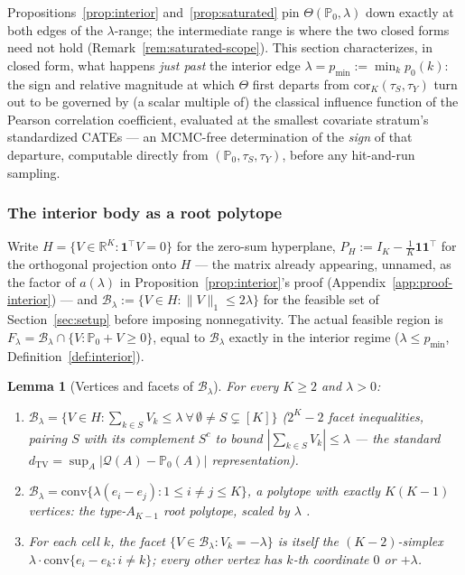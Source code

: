 \documentclass[11pt]{article}
\theoremstyle{plain}
\newtheorem{lemma}[theorem]{Lemma}
\theoremstyle{definition}
\theoremstyle{remark}
\newcommand{\PP}{\mathbb{P}}
\newcommand{\R}{\mathbb{R}}
\newcommand{\cB}{\mathcal{B}}
\newcommand{\Q}{\mathcal{Q}}
\newcommand{\Corr}{\mathrm{cor}}
\begin{document}
Propositions~\ref{prop:interior} and~\ref{prop:saturated} pin $\Theta(\PP_0,\lambda)$
down exactly at both edges of the $\lambda$-range; the intermediate range is where the
two closed forms need not hold (Remark~\ref{rem:saturated-scope}). This section
characterizes, in closed form, what happens \emph{just past} the interior edge
$\lambda=p_{\min}:=\min_kp_0(k)$: the sign and relative magnitude at which $\Theta$
first departs from $\Corr_K(\tau_S,\tau_Y)$ turn out to be governed by (a scalar
multiple of) the classical influence function of the Pearson correlation
coefficient, evaluated at the smallest covariate stratum's standardized CATEs --- an
MCMC-free determination of the \emph{sign} of that departure, computable directly
from $(\PP_0,\tau_S,\tau_Y)$, before any hit-and-run sampling.

\subsubsection{The interior body as a root polytope}

Write $H=\{V\in\R^K:\mathbf1^\top V=0\}$ for the zero-sum hyperplane,
$P_H:=I_K-\frac1K\mathbf1\mathbf1^\top$ for the orthogonal projection onto $H$ ---
the matrix already appearing, unnamed, as the factor of $a(\lambda)$ in
Proposition~\ref{prop:interior}'s proof (Appendix~\ref{app:proof-interior}) --- and
$\cB_\lambda:=\{V\in H:\|V\|_1\le2\lambda\}$ for the feasible set of
Section~\ref{sec:setup} before imposing nonnegativity. The actual feasible region is
$F_\lambda=\cB_\lambda\cap\{V:\PP_0+V\ge0\}$, equal to $\cB_\lambda$ exactly in the
interior regime ($\lambda\le p_{\min}$, Definition~\ref{def:interior}).

\begin{lemma}[Vertices and facets of $\cB_\lambda$]\label{lem:root-polytope}
For every $K\ge2$ and $\lambda>0$:
\begin{enumerate}[label=(\alph*)]
    \item $\cB_\lambda=\{V\in H:\sum_{k\in S}V_k\le\lambda\ \forall\,\emptyset\ne
    S\subsetneq[K]\}$ ($2^K-2$ facet inequalities, pairing $S$ with its complement
    $S^c$ to bound $|\sum_{k\in S}V_k|\le\lambda$ --- the standard
    $d_{\mathrm{TV}}=\sup_A|\Q(A)-\PP_0(A)|$ representation).
    \item $\cB_\lambda=\mathrm{conv}\{\lambda(e_i-e_j):1\le i\ne j\le K\}$, a polytope
    with exactly $K(K-1)$ vertices: the type-$A_{K-1}$ root polytope, scaled by
    $\lambda$ \citep[see][for the general theory of such
    bodies]{Postnikov2009}.
    \item For each cell $k$, the facet $\{V\in\cB_\lambda:V_k=-\lambda\}$ is itself
    the $(K-2)$-simplex $\lambda\cdot\mathrm{conv}\{e_i-e_k:i\ne k\}$; every other
    vertex has $k$-th coordinate $0$ or $+\lambda$.
\end{enumerate}
\end{lemma}
\end{document}
